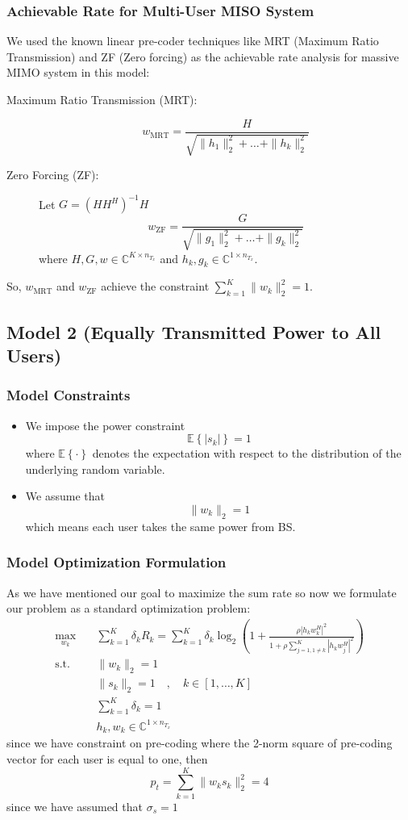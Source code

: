 \subsubsection{Achievable Rate for Multi-User MISO System}
We used the known linear pre-coder techniques like MRT (Maximum Ratio Transmission) and ZF (Zero forcing) as the achievable rate analysis for massive MIMO system in this model:
\begin{description}
    \item[Maximum Ratio Transmission (MRT):] \[ w_{\text{MRT}} = \frac{H}{\sqrt{\|h_1\|_2^2 + \ldots + \|h_k\|_2^2}} \]
    \item[Zero Forcing (ZF):] Let $G = \left( H H^H \right)^{-1} H$ \[ w_{\text{ZF}} = \frac{G}{\sqrt{\|g_1\|_2^2 + \ldots + \|g_k\|_2^2}} \]where $H, G, w \in \mathbb{C}^{K \times n_{T_x}}$ and $h_k, g_k \in \mathbb{C}^{1 \times n_{T_x}}$.
\end{description}
So, $w_{\text{MRT}}$ and $w_{\text{ZF}}$ achieve the constraint $\sum_{k=1}^{K}\|w_k\|^2_2 = 1$.

\subsection{Model 2 (Equally Transmitted Power to All Users)}
\subsubsection{Model Constraints}
\begin{itemize}
    \item We impose the power constraint \[\mathbb{E} \left\{ |s_k| \right\} = 1\] where $\mathbb{E}\left\{\cdot\right\}$ denotes the expectation with respect to the distribution of the underlying random variable.
    \item We assume that \[ \|w_k\|_2 = 1\] which means each user takes the same power from BS.
\end{itemize}
\subsubsection{Model Optimization Formulation}
As we have mentioned our goal to maximize the sum rate so now we formulate our problem as a standard optimization problem:
\begin{equation}
    \label{eq:multi-user opt sp}
    \begin{aligned}
        \max_{w_k} \quad & \sum_{k=1}^{K} \delta_k R_k = \sum_{k=1}^{K} \delta_k \log_2 \left( 1 + \frac{\rho | h_k w_k^H |^2}{1 + \rho \sum_{j=1, 1\neq k}^{K}| h_k w_j^H |^2} \right) \\
        \text{s.t.} \quad &  \|w_k\|_2 = 1 \\
        & \|s_k\|_2 =1 \quad , \quad k \in [1, \ldots , K] \\
        & \sum_{k=1}^{K} \delta_k = 1 \\
        & h_k, w_k \in \mathbb{C}^{1 \times n_{T_x}}
    \end{aligned}
\end{equation}
since we have constraint on pre-coding where the 2-norm square of pre-coding vector for each user is equal to one, then
\[ p_t = \sum_{k=1}^{K}\|w_k s_k\|^2_2 = 4 \]
since we have assumed that $\sigma_s =1$

